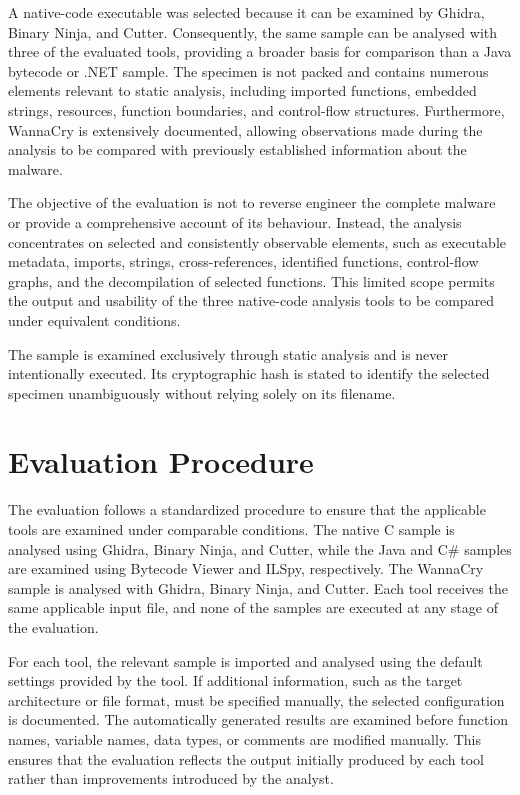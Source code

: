 A native-code executable was selected because it can be examined by Ghidra, Binary Ninja, and Cutter. Consequently, the same sample can be analysed with three of the 
evaluated tools, providing a broader basis for comparison than a Java bytecode or .NET sample. The specimen is not packed and contains numerous elements relevant to 
static analysis, including imported functions, embedded strings, resources, function boundaries, and control-flow structures. Furthermore, WannaCry is extensively documented, 
allowing observations made during the analysis to be compared with previously established information about the malware.

The objective of the evaluation is not to reverse engineer the complete malware or provide a comprehensive account of its behaviour. Instead, the analysis concentrates on 
selected and consistently observable elements, such as executable metadata, imports, strings, cross-references, identified functions, control-flow graphs, and the decompilation 
of selected functions. This limited scope permits the output and usability of the three native-code analysis tools to be compared under equivalent conditions.

The sample is examined exclusively through static analysis and is never intentionally executed. Its cryptographic hash is stated to identify the selected specimen unambiguously 
without relying solely on its filename.


\section{Evaluation Procedure}
\label{sec:methodology:procedure}
The evaluation follows a standardized procedure to ensure that the applicable tools are examined under comparable conditions. The native C sample is analysed using Ghidra, 
Binary Ninja, and Cutter, while the Java and C\# samples are examined using Bytecode Viewer and ILSpy, respectively. The WannaCry sample is analysed with Ghidra, Binary Ninja, and Cutter. 
Each tool receives the same applicable input file, and none of the samples are executed at any stage of the evaluation.

For each tool, the relevant sample is imported and analysed using the default settings provided by the tool. If additional information, such as the target architecture or 
file format, must be specified manually, the selected configuration is documented. The automatically generated results are examined before function names, variable names, 
data types, or comments are modified manually. This ensures that the evaluation reflects the output initially produced by each tool rather than improvements introduced by the analyst.

